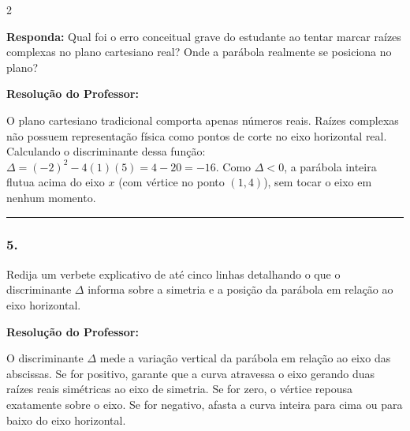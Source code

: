 \begin{multicols*}{2}
\begin{boxresponda}
\textbf{Responda:} Qual foi o erro conceitual grave do estudante ao tentar marcar raízes complexas no plano cartesiano real? Onde a parábola realmente se posiciona no plano?
\end{boxresponda}

\ifgabarito
    \begin{tcolorbox}[colback=CorTitUm!5, colframe=CorTitUm, boxrule=1pt, arc=4pt, left=6pt, right=6pt, top=6pt, bottom=6pt]
    \small\textbf{\textcolor{CorTitUm}{Resolução do Professor:}}\par\vspace{0.1cm}
    \color{CinzaEscuro}
    O plano cartesiano tradicional comporta apenas números reais. Raízes complexas não possuem representação física como pontos de corte no eixo horizontal real. Calculando o discriminante dessa função: $\Delta = (-2)^2 - 4(1)(5) = 4 - 20 = -16$. Como $\Delta < 0$, a parábola inteira flutua acima do eixo $x$ (com vértice no ponto $(1,4)$), sem tocar o eixo em nenhum momento.
    \end{tcolorbox}
\fi

\par\vspace{\espacoQuestao}

\noindent\textcolor{CorLinha}{\rule{\linewidth}{0.5pt}} 
\par\vspace{\espacoPreQuestao}
\subsubsection*{5.} Redija um verbete explicativo de até cinco linhas detalhando o que o discriminante $\Delta$ informa sobre a simetria e a posição da parábola em relação ao eixo horizontal.

\ifgabarito
    \begin{tcolorbox}[colback=CorTitUm!5, colframe=CorTitUm, boxrule=1pt, arc=4pt, left=6pt, right=6pt, top=6pt, bottom=6pt]
    \small\textbf{\textcolor{CorTitUm}{Resolução do Professor:}}\par\vspace{0.1cm}
    \color{CinzaEscuro}
    O discriminante $\Delta$ mede a variação vertical da parábola em relação ao eixo das abscissas. Se for positivo, garante que a curva atravessa o eixo gerando duas raízes reais simétricas ao eixo de simetria. Se for zero, o vértice repousa exatamente sobre o eixo. Se for negativo, afasta a curva inteira para cima ou para baixo do eixo horizontal.
    \end{tcolorbox}
\fi


\end{multicols*}
